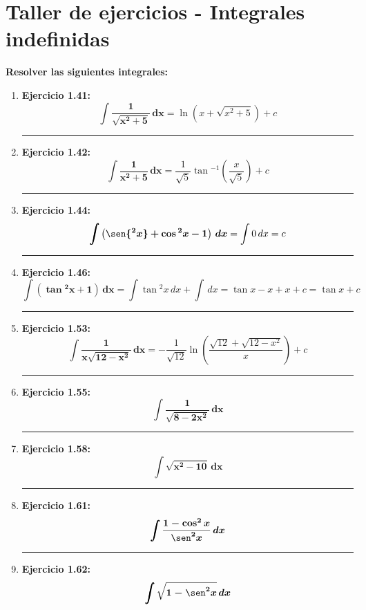 \documentclass[12pt]{article}
\begin{document}
    

    \section*{\centering Taller de ejercicios - Integrales indefinidas} \vspace{0.5cm}

    \textbf{Resolver las siguientes integrales: } \vspace{0.5cm}

    \begin{enumerate}[label=\textbf{\arabic*)}] 
        \hrule %
        \item \textbf{Ejercicio 1.41: }\[\bm{\int \frac{1}{\sqrt{x^2 + 5}} \, dx} = \ln{\left(x + \sqrt{x^2 + 5}\right)} + c\]
            
        
        \hrule %
        \item \textbf{Ejercicio 1.42: } \[\bm{\int \frac{1}{x^2 + 5} \, dx} = \frac{1}{\sqrt{5}} \tan{^{-1} \left(\frac{x}{\sqrt{5}}\right)} + c\]

        \hrule %
        \item \textbf{Ejercicio 1.44: } \[\bm{\int \left(\sen{^2x} + \cos{^2x} - 1\right) \, dx} = \int 0 \, dx = c\]


        \hrule %
        \item \textbf{Ejercicio 1.46: } \[\bm{\int (\tan{^2x} + 1) \, dx} = \int \tan{^2x} \, dx + \int \, dx = \tan{x} - x + x + c = \tan{x} + c\]


        \hrule %
        \item \textbf{Ejercicio 1.53: } \[\bm{\int \frac{1}{x\sqrt{12 - x^2}} \, dx} = -\frac{1}{\sqrt{12}} \ln{\left(\frac{\sqrt{12} + \sqrt{12 - x^2}}{x}\right)} + c\]


        \hrule %
        \item \textbf{Ejercicio 1.55:} \[\bm{\int \frac{1}{\sqrt{8 - 2x^2}} \, dx}\]


        \hrule %
        \item \textbf{Ejercicio 1.58: } \[\bm{\int \sqrt{x^2 - 10} \, dx}\]


        \hrule %
        \item \textbf{Ejercicio 1.61: } \[\bm{\int \frac{1 - \cos^2{x}}{\sen^2{x}} \, dx}\]


        \hrule %
        \item \textbf{Ejercicio 1.62: } \[\bm{\int \sqrt{1 - \sen^2{x}} \, dx}\]



\end{enumerate}
\end{document}
